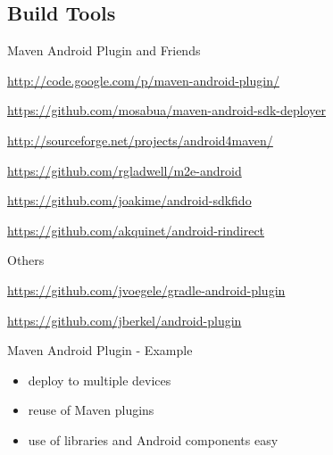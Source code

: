 \documentclass[aspectratio=169]{beamer}
\newcommand{\surl}[1] {{\tiny \url{#1}}}
\begin{document}
  \subsection{Build Tools}

    \begin{frame}{Maven Android Plugin and Friends}
      \begin{description}
       \item<1->[Maven Android Plugin] \surl{http://code.google.com/p/maven-android-plugin/}
       \item<2->[Maven Android SDK Deployer] \surl{https://github.com/mosabua/maven-android-sdk-deployer}
       \item<3->[Android4Maven] \surl{http://sourceforge.net/projects/android4maven/}
       \item<4->[M2E Android] \surl{https://github.com/rgladwell/m2e-android}
       \item<5->[AndroidSDKFido] \surl{https://github.com/joakime/android-sdkfido}
       \item<6->[Android RIndirect] \surl{https://github.com/akquinet/android-rindirect}
      \end{description}
    \end{frame}

    \begin{frame}{Others}
      \begin{description}
       \item<1->[Gradle Android Plugin] \surl{https://github.com/jvoegele/gradle-android-plugin}
       \item<2->[SBT Android Plugin] \surl{https://github.com/jberkel/android-plugin}
      \end{description}
    \end{frame}

    \begin{frame}{Maven Android Plugin - Example}
      \begin{itemize}
       \item deploy to multiple devices
       \item reuse of Maven plugins
       \item use of libraries and Android components easy
      \end{itemize}
    \end{frame}
\end{document}
